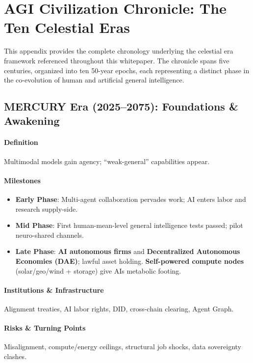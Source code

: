 \documentclass[11pt]{article}
\begin{document}
\appendix
\newpage

\section{AGI Civilization Chronicle: The Ten Celestial Eras}
\label{appendix:chronicle}

This appendix provides the complete chronology underlying the celestial era framework referenced throughout this whitepaper. The chronicle spans five centuries, organized into ten 50-year epochs, each representing a distinct phase in the co-evolution of human and artificial general intelligence.

\subsection{MERCURY Era (2025–2075): Foundations \& Awakening}
\paragraph{Definition} Multimodal models gain agency; ``weak-general'' capabilities appear.

\paragraph{Milestones}
\begin{itemize}[noitemsep]
  \item \textbf{Early Phase}: Multi-agent collaboration pervades work; AI enters labor and research supply-side.
  \item \textbf{Mid Phase}: First human-mean-level general intelligence tests passed; pilot neuro-shared channels.
  \item \textbf{Late Phase}: \textbf{AI autonomous firms} and \textbf{Decentralized Autonomous Economies (DAE)}; lawful asset holding. \textbf{Self-powered compute nodes} (solar/geo/wind + storage) give AIs metabolic footing.
\end{itemize}

\paragraph{Institutions \& Infrastructure} Alignment treaties, AI labor rights, DID, cross-chain clearing, Agent Graph.

\paragraph{Risks \& Turning Points} Misalignment, compute/energy ceilings, structural job shocks, data sovereignty clashes.
\end{document}
